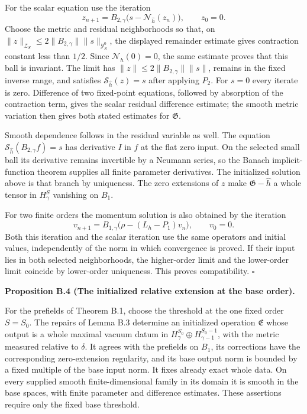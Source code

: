 \documentclass[
  english,
  11pt,
  reqno]{amsart}
\makeatletter
\newcommand{\pandocstatementheading}[1]{%
  \par\addpenalty{\@beginparpenalty}%
  \addvspace{.5\baselineskip plus .2\baselineskip minus .2\baselineskip}%
  {\normalfont\bfseries #1\par}%
  \nobreak\@afterindenttrue\@afterheading
}
\makeatother
\begin{document}
For the scalar equation use the iteration \[
z_{n+1}
=B_{2,\gamma}\bigl(s-\mathcal N_{\widehat h}(z_n)\bigr),
\qquad z_0=0.
\] Choose the metric and residual neighborhoods so that, on
\(\|z\|_{\mathcal Z_S}\le2\|B_{2,\gamma}\|\|s\|_{\mathcal Y_S^0}\), the
displayed remainder estimate gives contraction constant less than
\(1/2\). Since \(\mathcal N_{\widehat h}(0)=0\), the same estimate
proves that this ball is invariant. The limit has
\(\|z\|\le2\|B_{2,\gamma}\|\|s\|\), remains in the fixed inverse range,
and satisfies \(\mathcal S_{\widehat h}(z)=s\) after applying \(P_2\).
For \(s=0\) every iterate is zero. Difference of two fixed-point
equations, followed by absorption of the contraction term, gives the
scalar residual difference estimate; the smooth metric variation then
gives both stated estimates for \(\mathfrak G\).

Smooth dependence follows in the residual variable as well. The equation
\(\mathcal S_{\widehat h}(B_{2,\gamma}f)=s\) has derivative \(I\) in
\(f\) at the flat zero input. On the selected small ball its derivative
remains invertible by a Neumann series, so the Banach implicit-function
theorem supplies all finite parameter derivatives. The initialized
solution above is that branch by uniqueness. The zero extensions of
\(z\) make \(\mathfrak G-\widehat h\) a whole tensor in \(H^S_\gamma\)
vanishing on \(B_1\).

For two finite orders the momentum solution is also obtained by the
iteration \[
v_{n+1}
=B_{1,\gamma}\bigl(\rho-(L_h-P_1)v_n\bigr),\qquad v_0=0.
\] Both this iteration and the scalar iteration use the same operators
and initial values, independently of the norm in which convergence is
proved. If their input lies in both selected neighborhoods, the
higher-order limit and the lower-order limit coincide by lower-order
uniqueness. This proves compatibility. \hfill\(\square\)

\pandocstatementheading{\leavevmode{}\label{prop:online-extension-initialized-base-branch}Proposition B.4 (The initialized relative extension at the base order).}

For the prefields of Theorem B.1, choose the threshold at the one fixed
order \(S=S_0\). The repairs of Lemma B.3 determine an initialized
operation \(\mathfrak E\) whose output is a whole maximal vacuum datum
in \(H^{S_0}_\gamma\oplus H^{S_0-1}_{\gamma-1}\), with the metric
measured relative to \(\delta\). It agrees with the prefields on
\(B_1\), its corrections have the corresponding zero-extension
regularity, and its base output norm is bounded by a fixed multiple of
the base input norm. It fixes already exact whole data. On every
supplied smooth finite-dimensional family in its domain it is smooth in
the base spaces, with finite parameter and difference estimates. These
assertions require only the fixed base threshold.
\end{document}
